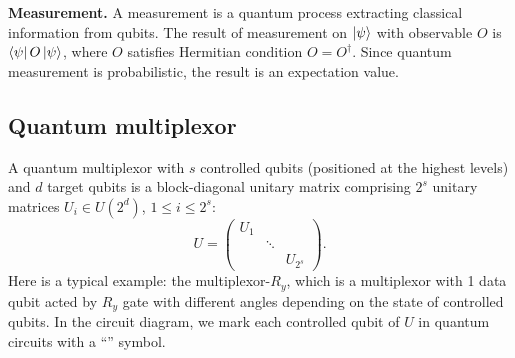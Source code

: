 \documentclass{article}
\theoremstyle{plain}
\theoremstyle{definition}
\theoremstyle{remark}
\begin{document}
\textbf{Measurement.} A measurement is a quantum process extracting classical information from qubits. The result of measurement on $\ket{\psi}$ with observable $O$ is $\bra{\psi}O\ket{\psi}$, where $O$ satisfies Hermitian condition $O=O^\dagger$. Since quantum measurement is probabilistic, the result is an expectation value.


\subsection{Quantum multiplexor}
A quantum multiplexor \cite{Shende2006} with $s$ controlled qubits (positioned at the highest levels) and $d$ target qubits is a block-diagonal unitary matrix comprising $2^s$ unitary matrices $U_i\in U(2^d)$, $1\leq i \leq2^s$:
    \begin{equation*}
    U = 
    \begin{pmatrix}
        U_1&& \\
        &\ddots&\\
        &&U_{2^s}
    \end{pmatrix}.
\end{equation*}
Here is a typical example: the multiplexor-$R_y$, which is a multiplexor with 1 data qubit acted by $R_y$ gate with different angles depending on the state of controlled qubits. In the circuit diagram, we mark each controlled qubit of $U$ in quantum circuits with a ``$\boxed{}$'' symbol.
\begin{center}
\end{center}
\end{document}
